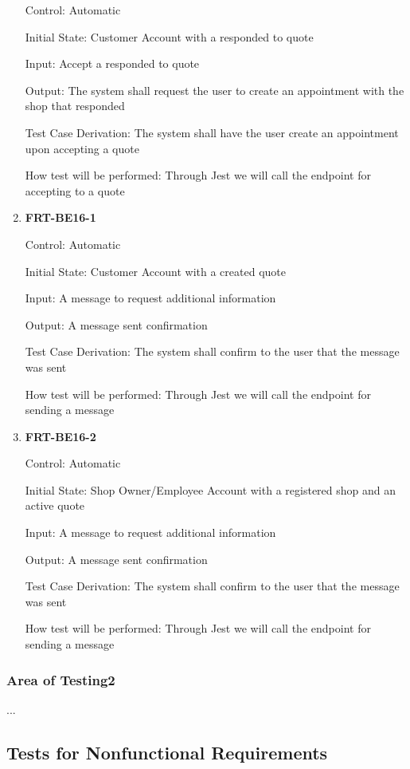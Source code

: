 \documentclass[12pt, titlepage]{article}
\begin{document}
\begin{enumerate}
	      Control: Automatic

	      Initial State: Customer Account with a responded to quote

	      Input: Accept a responded to quote

	      Output: The system shall request the user to create an appointment with the shop that responded

	      Test Case Derivation: The system shall have the user create an appointment upon accepting a quote

	      How test will be performed: Through Jest we will call the endpoint for accepting to a quote

	\item \textbf{FRT-BE16-1}

	      Control: Automatic

	      Initial State: Customer Account with a created quote

	      Input: A message to request additional information

	      Output: A message sent confirmation

	      Test Case Derivation: The system shall confirm to the user that the message was sent

	      How test will be performed: Through Jest we will call the endpoint for sending a message

	\item \textbf{FRT-BE16-2}

	      Control: Automatic

	      Initial State: Shop Owner/Employee Account with a registered shop and an active quote

	      Input: A message to request additional information

	      Output: A message sent confirmation

	      Test Case Derivation: The system shall confirm to the user that the message was sent

	      How test will be performed: Through Jest we will call the endpoint for sending a message

\end{enumerate}

\subsubsection{Area of Testing2}

...

\subsection{Tests for Nonfunctional Requirements}
\end{document}
